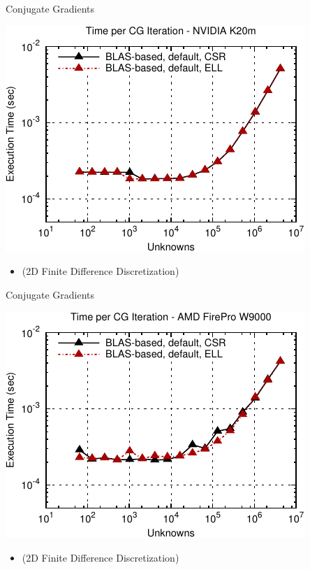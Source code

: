 \begin{frame}[fragile]{Conjugate Gradients}
 \begin{block}{}
 \begin{center}
  \vspace*{-0.5cm}
  \includegraphics[width=0.85\textwidth]{figures/cg-k20m-1}
 \end{center}

 \begin{itemize}
  \item   \vspace*{-0.3cm} {\small (2D Finite Difference Discretization)}
 \end{itemize}
 \end{block}   
\end{frame}

\begin{frame}[fragile]{Conjugate Gradients}
 \begin{block}{}
 \begin{center}
  \vspace*{-0.5cm}
  \includegraphics[width=0.85\textwidth]{figures/cg-firepro-w9000-1}
 \end{center}

 \begin{itemize}
  \item   \vspace*{-0.3cm} {\small (2D Finite Difference Discretization)}
 \end{itemize}
 \end{block}   
\end{frame}


